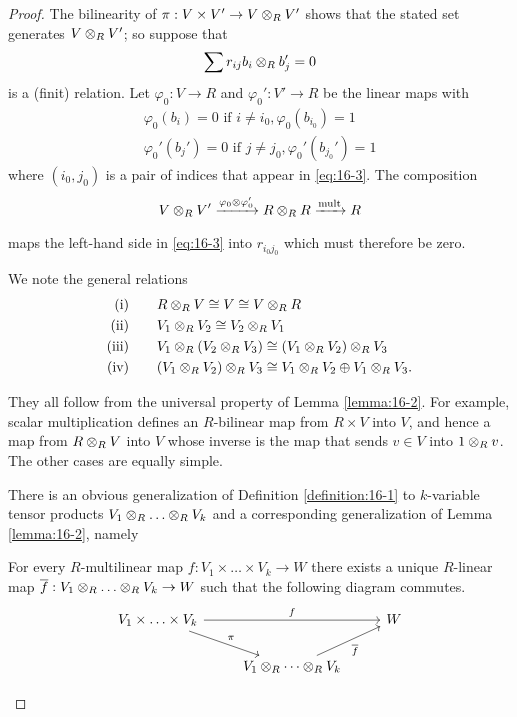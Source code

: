 \begin{proof}
  The bilinearity of $\pi:V\times V'\to V\otimes_R V'$ shows that the stated set generates $V\otimes_R V'$; 
  so suppose that
  \begin{align}\label{eq:16-3}
    \sum r_{ij}b_i\otimes_R b_j' = 0
  \end{align}
  is a (finit) relation. Let $\varphi_0:V\to R$ and $\varphi_0':V'\to R$ be the linear maps with 
  \[\begin{matrix}
    \varphi_0(b_i) = 0 \text{ if } i\neq i_0, \varphi_0(b_{i_0}) = 1 \\
    \varphi_0'(b_j') = 0 \text{ if } j\neq j_0, \varphi_0'(b_{j_0}') = 1
  \end{matrix}\]
  where $(i_0, j_0)$ is a pair of indices that appear in \eqref{eq:16-3}. The composition
  \[
    V\otr V' \xra[\varphi_0\otimes\varphi_0'] R\otr R \xra*[mult] R
  \]
  maps the left-hand side in \eqref{eq:16-3} into $r_{i_0j_0}$ which must therefore be zero.

  We note the general relations
  \begin{align}\label{eq:16-4}
    \begin{aligned}
      \text{(i)}\qquad & R\otimes_R V \cong V \cong V\otimes_R R \\
      \text{(ii)}\qquad & V_1\otimes_R V_2 \cong V_2\otimes_R V_1 \\
      \text{(iii)}\qquad & V_1\otimes_R(V_2\otimes_R V_3)\cong (V_1\otimes_R V_2)\otimes_R V_3 \\
      \text{(iv)}\qquad & (V_1\otimes_R V_2)\otimes_R V_3 \cong V_1\otimes_R V_2 \oplus V_1\otimes_R V_3.
    \end{aligned}
  \end{align}

  They all follow from the universal property of Lemma \ref{lemma:16-2}. For example, scalar
  multiplication defines an $R$-bilinear map from $R\times V$ into $V$, and hence a map
  from $R\otimes_R V$ into $V$ whose inverse is the map that sends $v\in V$ into $1\otimes_R v$. The
  other cases are equally simple.


  There is an obvious generalization of Definition \ref{definition:16-1} to $k$-variable tensor products
  $V_1\otimes_R\ldots\otimes_R V_k$ and a corresponding generalization of Lemma \ref{lemma:16-2}, namely

  \begin{lemma}\label{lemma:16-4}
    For every $R$-multilinear map $f:V_1\times\ldots\times V_k\to W$ there exists a unique $R$-linear map 
    $\overline{f}:V_1\otimes_R\ldots\otimes_R V_k\to W$ such that the following diagram commutes.
    \[\begin{tikzcd}
    V_1\times\ldots\times V_k \arrow[rr, "f"] \arrow[dr, "\pi"] &  & W \\
    & V_1\otr\cdots\otr V_k \arrow[ur, "\overline{f}"'] & 
    \end{tikzcd}\]
  \end{lemma}
\end{proof}

